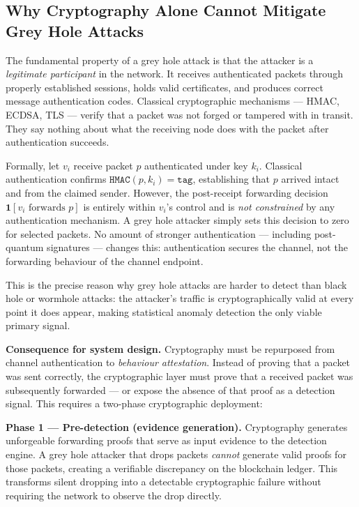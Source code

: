 \documentclass[12pt, a4paper]{report}
\newcommand{\mypar}{\vspace{0.8em}\noindent}
\begin{document}
\subsection{Why Cryptography Alone Cannot Mitigate Grey Hole Attacks}

The fundamental property of a grey hole attack is that the attacker is a
\emph{legitimate participant} in the network. It receives authenticated packets
through properly established sessions, holds valid certificates, and produces
correct message authentication codes. Classical cryptographic mechanisms --- HMAC,
ECDSA, TLS --- verify that a packet was not forged or tampered with in transit.
They say nothing about what the receiving node does with the packet after
authentication succeeds.

Formally, let $v_i$ receive packet $p$ authenticated under key $k_i$. Classical
authentication confirms $\texttt{HMAC}(p, k_i) = \texttt{tag}$, establishing
that $p$ arrived intact and from the claimed sender. However, the post-receipt
forwarding decision $\mathbf{1}[v_i \text{ forwards } p]$ is entirely within
$v_i$'s control and is \emph{not constrained} by any authentication mechanism.
A grey hole attacker simply sets this decision to zero for selected packets.
No amount of stronger authentication --- including post-quantum signatures --- changes
this: authentication secures the channel, not the forwarding behaviour of
the channel endpoint.

This is the precise reason why grey hole attacks are harder to detect than
black hole or wormhole attacks: the attacker's traffic is cryptographically
valid at every point it does appear, making statistical anomaly detection the
only viable primary signal.

\mypar
\textbf{Consequence for system design.} Cryptography must be repurposed from
channel authentication to \emph{behaviour attestation}. Instead of proving
that a packet was sent correctly, the cryptographic layer must prove that a
received packet was subsequently forwarded --- or expose the absence of that proof
as a detection signal. This requires a two-phase cryptographic deployment:

\textbf{Phase 1 --- Pre-detection (evidence generation).}
Cryptography generates unforgeable forwarding proofs that serve as input evidence to the detection engine. A grey hole attacker that drops packets \emph{cannot} generate valid proofs for those packets, creating a verifiable discrepancy on the blockchain ledger. This transforms silent dropping into a detectable cryptographic failure without requiring the network to observe the drop directly.
\end{document}
